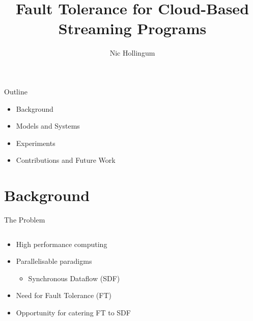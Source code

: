 \documentclass{beamer}
\title[SDF]{Fault Tolerance for Cloud-Based Streaming Programs}
\author{Nic Hollingum}
\institute{USYD}
\begin{document}
\begin{frame}
\titlepage
\end{frame}

\begin{frame}{Outline}
\begin{itemize}
	\item Background
	\item Models and Systems
	\item Experiments
	\item Contributions and Future Work
\end{itemize}
\end{frame}

\section{Background}

\begin{frame}{The Problem}
\begin{columns}
\begin{column}{6cm}
\begin{itemize}
	\item High performance computing
	\item Parallelisable paradigms
		\begin{itemize}
			\item Synchronous Dataflow (SDF)
		\end{itemize}
	\item Need for Fault Tolerance (FT)
	\item Opportunity for catering FT to SDF
\end{itemize}
\end{column}
\begin{column}{4cm}
\end{column}
\end{columns}
\end{frame}
\end{document}
